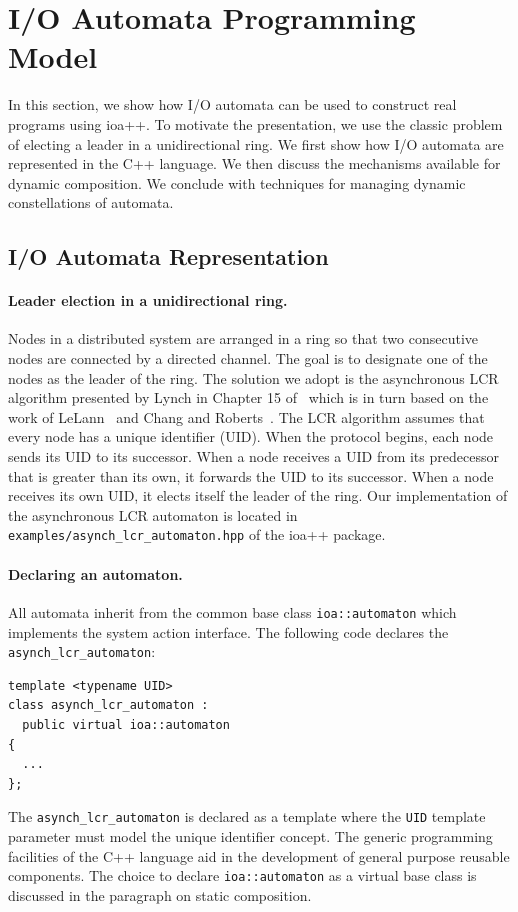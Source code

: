 \section{I/O Automata Programming Model\label{representation}}

In this section, we show how I/O automata can be used to construct real programs using ioa++.
To motivate the presentation, we use the classic problem of electing a leader in a unidirectional ring.
We first show how I/O automata are represented in the C++ language.
We then discuss the mechanisms available for dynamic composition.
We conclude with techniques for managing dynamic constellations of automata.

\subsection{I/O Automata Representation}

\paragraph{Leader election in a unidirectional ring.}
Nodes in a distributed system are arranged in a ring so that two consecutive nodes are connected by a directed channel.
The goal is to designate one of the nodes as the leader of the ring.
The solution we adopt is the asynchronous LCR algorithm presented by Lynch in Chapter 15 of~\cite{lynch1996distributed} which is in turn based on the work of LeLann~\cite{le1977distributed} and Chang and Roberts~\cite{chang1979improved}.
The LCR algorithm assumes that every node has a unique identifier (UID).
When the protocol begins, each node sends its UID to its successor.
When a node receives a UID from its predecessor that is greater than its own, it forwards the UID to its successor.
When a node receives its own UID, it elects itself the leader of the ring.
Our implementation of the asynchronous LCR automaton is located in \verb+examples/asynch_lcr_automaton.hpp+ of the ioa++ package.

\paragraph{Declaring an automaton.}
All automata inherit from the common base class \verb+ioa::automaton+ which implements the system action interface.
The following code declares the \verb+asynch_lcr_automaton+:
\begin{lstlisting}
template <typename UID>
class asynch_lcr_automaton :
  public virtual ioa::automaton
{
  ...
};
\end{lstlisting}
The \verb+asynch_lcr_automaton+ is declared as a template where the \verb+UID+ template parameter must model the unique identifier concept.
The generic programming facilities of the C++ language aid in the development of general purpose reusable components.
The choice to declare \verb+ioa::automaton+ as a virtual base class is discussed in the paragraph on static composition.

